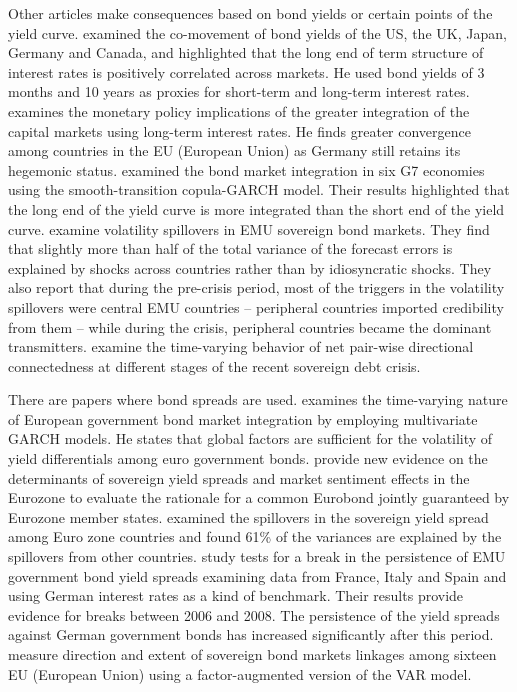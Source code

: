 \documentclass[12pt,bibliography=totoc]{article}
\begin{document}
Other articles make consequences based on bond yields or certain points of the yield curve. 
\cite{sutton2000there} examined the co-movement of bond yields of the US, the UK, Japan, Germany and Canada, and highlighted that the long end of term structure of interest rates is positively correlated across markets. He used bond yields of 3 months and 10 years as proxies for short-term and long-term interest rates.
\cite{laopodis2004monetary} examines the monetary policy implications of the greater integration of the capital markets using long-term interest rates. He finds greater convergence among countries in the EU (European Union) as Germany still retains its hegemonic status.
\cite{kumar2011dynamics} examined the bond market integration in six G7 economies using the smooth-transition copula-GARCH model. 
Their results highlighted that the long end of the yield curve is more integrated than the short end of the yield curve.  
\cite{fernandez2015volatility} examine volatility spillovers in EMU sovereign bond markets. They find that slightly more than half of the total variance of the forecast errors is explained by shocks across countries rather than by idiosyncratic shocks. They also report that during the pre-crisis period, most of the triggers in the volatility spillovers were central EMU countries – peripheral countries imported credibility from them – while during the crisis, peripheral countries became the dominant transmitters. 
\cite{fernandez2016using} examine the time-varying behavior of net pair-wise directional connectedness at different stages of the recent sovereign debt crisis.

There are papers where bond spreads are used.
\cite{balli2009spillover} examines the time-varying nature of European government bond market integration by employing multivariate GARCH models. 
He states that global factors are sufficient for the volatility of yield differentials among euro government bonds.
\cite{favero2012sovereign} provide new evidence on the determinants of sovereign yield spreads and market sentiment effects in the Eurozone to evaluate the rationale for a common Eurobond jointly guaranteed by Eurozone member states. 
\cite{antonakakis2013sovereign} examined the spillovers in the sovereign yield spread among Euro zone countries and found 61\% of the variances are explained by the spillovers from other countries. 
\cite{sibbertsen2014testing} study tests for a break in the persistence of EMU government bond yield spreads examining data from France, Italy and Spain and using German interest rates as a kind of benchmark. 
Their results provide evidence for breaks between 2006 and 2008. The persistence of the yield spreads against German government bonds has increased significantly after this period. 
\cite{claeys2014measuring} measure direction and extent of sovereign bond markets linkages among sixteen EU (European Union) using a factor-augmented version of the VAR model.
\end{document}
